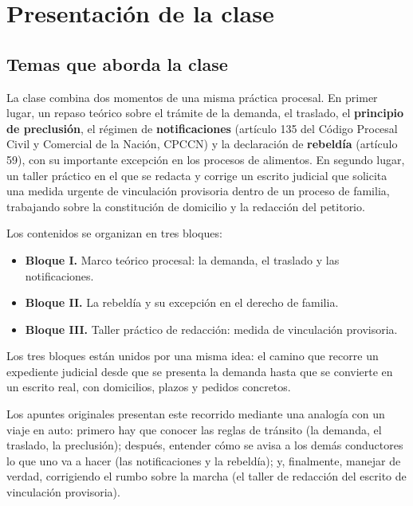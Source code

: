 \documentclass[12pt,oneside]{book}
\begin{document}
\chapter{Presentaci\'on de la clase}

\section{Temas que aborda la clase}

La clase combina dos momentos de una misma pr\'actica procesal. En primer lugar, un repaso te\'orico sobre el tr\'amite de la demanda, el traslado, el \textbf{principio de preclusi\'on}, el r\'egimen de \textbf{notificaciones} (art\'iculo 135 del C\'odigo Procesal Civil y Comercial de la Naci\'on, CPCCN) y la declaraci\'on de \textbf{rebeld\'ia} (art\'iculo 59), con su importante excepci\'on en los procesos de alimentos. En segundo lugar, un taller pr\'actico en el que se redacta y corrige un escrito judicial que solicita una medida urgente de vinculaci\'on provisoria dentro de un proceso de familia, trabajando sobre la constituci\'on de domicilio y la redacci\'on del petitorio.

Los contenidos se organizan en tres bloques:
\begin{itemize}
    \item \textbf{Bloque I.} Marco te\'orico procesal: la demanda, el traslado y las notificaciones.
    \item \textbf{Bloque II.} La rebeld\'ia y su excepci\'on en el derecho de familia.
    \item \textbf{Bloque III.} Taller pr\'actico de redacci\'on: medida de vinculaci\'on provisoria.
\end{itemize}

Los tres bloques est\'an unidos por una misma idea: el camino que recorre un expediente judicial desde que se presenta la demanda hasta que se convierte en un escrito real, con domicilios, plazos y pedidos concretos.

\begin{note}
Los apuntes originales presentan este recorrido mediante una analog\'ia con un viaje en auto: primero hay que conocer las reglas de tr\'ansito (la demanda, el traslado, la preclusi\'on); despu\'es, entender c\'omo se avisa a los dem\'as conductores lo que uno va a hacer (las notificaciones y la rebeld\'ia); y, finalmente, manejar de verdad, corrigiendo el rumbo sobre la marcha (el taller de redacci\'on del escrito de vinculaci\'on provisoria).
\end{note}
\end{document}
